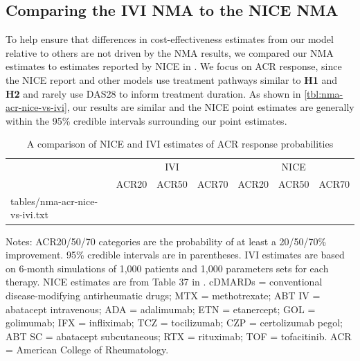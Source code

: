 \documentclass[11pt,final,fleqn]{article}\usepackage[]{graphicx}\usepackage[]{color}
\makeatletter
\theoremstyle{plain}
\newcommand*\ExpandableInput[1]{\@@input#1 }
\makeatother
\begin{document}
\begin{appendices}
\subsection{Comparing the IVI NMA to the NICE NMA}\label{app:nma-ivi-nice-comp}
To help ensure that differences in cost-effectiveness estimates from our model relative to others are not driven by the NMA results, we compared our NMA estimates to estimates reported by NICE in \citet{stevenson2016adalimumab}. We focus on ACR response, since the NICE report and other models use treatment pathways similar to \textbf{H1} and \textbf{H2} and rarely use DAS28 to inform treatment duration. As shown in \autoref{tbl:nma-acr-nice-vs-ivi}, our results are similar and the NICE point estimates are generally within the 95\% credible intervals surrounding our point estimates.

\begin{table}[!ht]
\begin{center}
\scriptsize
\begin{threeparttable}
\caption{A comparison of NICE and IVI estimates of ACR response probabilities} \label{tbl:nma-acr-nice-vs-ivi}
\begin{tabularx}{\textwidth}{@{\extracolsep{\fill}}lrrrrrr}
\hline
\multicolumn{1}{c}{} & \multicolumn{3}{c}{IVI} & \multicolumn{3}{c}{NICE}\\
\cmidrule(lr){2-4} \cmidrule(lr){5-7}
\multicolumn{1}{l}{} & \multicolumn{1}{c}{ACR20} & \multicolumn{1}{c}{ACR50} & \multicolumn{1}{c}{ACR70} & \multicolumn{1}{c}{ACR20} & \multicolumn{1}{c}{ACR50} & \multicolumn{1}{c}{ACR70}\\
\hline
\ExpandableInput{tables/nma-acr-nice-vs-ivi.txt}
\hline
\end{tabularx}
\scriptsize
Notes: ACR20/50/70 categories are the probability of at least a 20/50/70\% improvement. 95\% credible intervals are in parentheses. IVI estimates are based on 6-month simulations of 1,000 patients and 1,000 parameters sets for each therapy. NICE estimates are from Table 37 in \citet{stevenson2017cost}. cDMARDs = conventional disease-modifying antirheumatic drugs; MTX = methotrexate; ABT IV = abatacept intravenous; ADA = adalimumab; ETN = etanercept; GOL = golimumab; IFX = infliximab; TCZ = tocilizumab; CZP = certolizumab pegol; ABT SC = abatacept subcutaneous; RTX = rituximab; TOF = tofacitinib. ACR = American College of Rheumatology.
\end{threeparttable}
\end{center}
\end{table}

\end{appendices}


\end{document}
